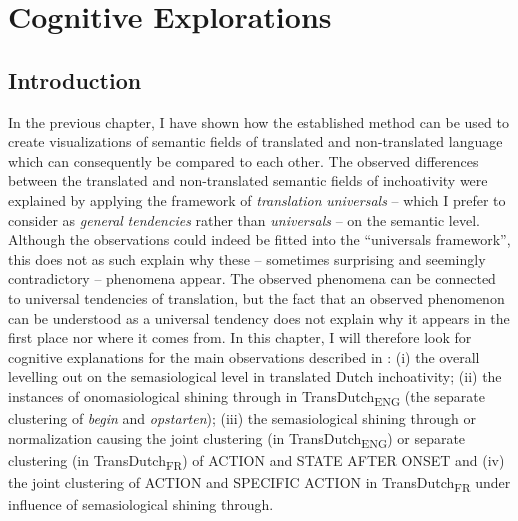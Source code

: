 \chapter{Cognitive Explorations}
\label{sec:5}
\section{Introduction}
\label{sec:5.1}  
In the previous chapter, I have shown how the established method can be used to create visualizations of semantic fields of translated and non-translated language which can consequently be compared to each other. The observed differences between the translated and non-translated semantic fields of inchoativity were explained by applying the framework of \textit{translation} \textit{universals} – which I prefer to consider as \textit{general} \textit{tendencies} rather than \textit{universals} – on the semantic level. Although the observations could indeed be fitted into the “universals framework”, this does not as such explain why these – sometimes surprising and seemingly contradictory – phenomena appear. The observed phenomena can be connected to universal tendencies of translation, but the fact that an observed phenomenon can be understood as a universal tendency does not explain why it appears in the first place nor where it comes from. In this chapter, I will therefore look for cognitive explanations for the main observations described in : (i) the overall levelling out on the semasiological level in translated Dutch inchoativity; (ii) the instances of onomasiological shining through in TransDutch\textsubscript{ENG} (the separate clustering of \textit{begin} and \textit{opstarten}); (iii) the semasiological shining through or normalization causing the joint clustering (in TransDutch\textsubscript{ENG}) or separate clustering (in TransDutch\textsubscript{FR}) of ACTION and STATE AFTER ONSET and (iv) the joint clustering of ACTION and SPECIFIC ACTION in TransDutch\textsubscript{FR} under influence of semasiological shining through.

